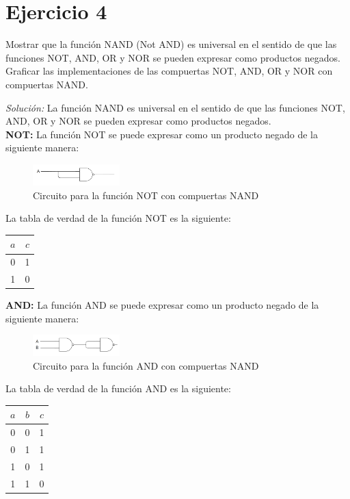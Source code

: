 \documentclass{article}
\newenvironment{solution}
    {\textit{Solución:}}
    {}
\begin{document}
\section*{Ejercicio 4}
Mostrar que la función NAND (Not AND) es universal en el sentido de que las funciones NOT, AND, OR y NOR se pueden expresar como productos negados. Graficar las implementaciones de las compuertas NOT, AND, OR y NOR con compuertas NAND.

\begin{solution}
La función NAND es universal en el sentido de que las funciones NOT, AND, OR y NOR se pueden expresar como productos negados.\\

\textbf{NOT:} La función NOT se puede expresar como un producto negado de la siguiente manera:
\begin{figure}[H]
    \centering
    \includegraphics[width=0.3\textwidth]{tp02fig7.png}
    \caption{Circuito para la función NOT con compuertas NAND}
\end{figure}
La tabla de verdad de la función NOT es la siguiente:
\begin{table}[H]
    \centering
    \begin{tabular}{|c|c|}
    \hline
    $a$ & $c$ \\ \hline
    0   & 1   \\ \hline
    1   & 0   \\ \hline
    \end{tabular}
\end{table}

\textbf{AND:} La función AND se puede expresar como un producto negado de la siguiente manera:
\begin{figure}[H]
    \centering
    \includegraphics[width=0.3\textwidth]{tp02fig8.png}
    \caption{Circuito para la función AND con compuertas NAND}
\end{figure}
La tabla de verdad de la función AND es la siguiente:
\begin{table}[H]
    \centering
    \begin{tabular}{|c|c|c|}
    \hline
    $a$ & $b$ & $c$ \\ \hline
    0   & 0   & 1   \\ \hline
    0   & 1   & 1   \\ \hline
    1   & 0   & 1   \\ \hline
    1   & 1   & 0   \\ \hline
    \end{tabular}
\end{table}


\end{solution}
\end{document}
